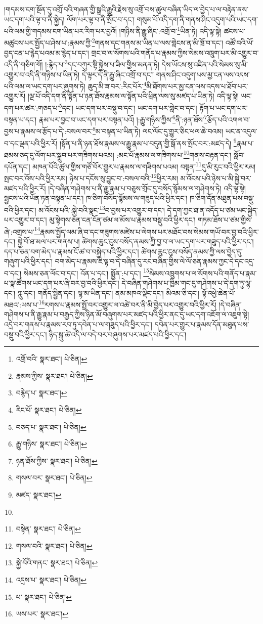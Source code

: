 །གདམས་ངག་སྔོན་དུ་འགྲོ་བའི་གཞན་གྱི་སྒྲའི་རྒྱུའི་རྗེས་སུ་འགྲོ་བས་ཚུལ་བཞིན་ཡིད་ལ་བྱེད་པ་ལ་བརྟེན་ནས་ཡང་དག་པའི་ལྟ་བ་ནི་སྐྱེད། ལོག་པར་ལྟ་བ་ནི་སྤོང་བ་དང་། གསུམ་པོ་འདི་དག་ནི་གནས་ཤིང་འདུག་པའི་ཡང་དག་པའི་ལམ་གྱི་གདམས་ངག་ཡིན་པར་རིག་པར་བྱའོ། །གཉིས་ནི་རྒྱུ་ཞིང་:འགྲོ་བ་\footnote{འགྲོ་བའི་  སྣར་ཐང་།  པེ་ཅིན། }ཡིན་ཏེ། འདི་ལྟ་སྟེ། ཚངས་པ་མཚུངས་པར་སྤྱོད་པ་ཤེས་པ་:རྣམས་ཀྱི་\footnote{རྣམས་ཀྱིས་  སྣར་ཐང་།  པེ་ཅིན། }གནས་དང་གནས་མ་ཡིན་པ་ལས་གླེངས་ན་མི་ཁྲོ་བ་དང་། འཚོ་བའི་ཡོ་བྱད་ངན་པ་རྙེད་པའམ་མ་རྙེད་པ་དང་། གྲང་བ་ལ་སོགས་པའི་གནོད་པ་རྣམས་ཀྱིས་སེམས་འཁྲུག་པར་མི་འགྱུར་བ་འདི་ནི་གཅིག་གོ། །:རྙེད་པ་\footnote{བརྙེད་པ་  སྣར་ཐང་། }དང་བཀུར་སྟི་སྐྱེས་པ་ཟིལ་གྱིས་མནན་ཏེ། དེས་ཡོངས་སུ་འཛིན་པའི་སེམས་སུ་མི་འགྱུར་བ་འདི་ནི་གཉིས་པ་ཡིན་ཏེ། དེ་ལྟར་དེ་ནི་རྒྱུ་ཞིང་འགྲོ་བ་དང་། གནས་ཤིང་འདུག་པས་མྱ་ངན་ལས་འདས་པའི་ལམ་ལ་ཡང་དག་པར་ཞུགས་ཏེ། ཆུད་མི་ཟ་བར་:རིང་པོར་\footnote{རིང་པོ་  སྣར་ཐང་།  པེ་ཅིན། }མི་ཐོགས་པར་མྱ་ངན་ལས་འདས་པ་ཐོབ་པར་འགྱུར་རོ། །ལྔ་པོ་འདི་དག་ནི་སྟོན་པ་ཉན་ཐོས་རྣམས་ལ་སྟོན་པའི་ཕྲིན་ལས་སུ་མཛད་པ་ཡིན་ཏེ། འདི་ལྟ་སྟེ། ཡང་དག་པར་ཚར་:གཅད་པ་\footnote{བཅད་པ་  སྣར་ཐང་།  པེ་ཅིན། }དང་། ཡང་དག་པར་བསྡུ་བ་དང་། ཡང་དག་པར་གླེང་བ་དང་། རྟོག་པ་ཡང་དག་པར་བསྟན་པ་དང་། རྣམ་པར་བྱང་བ་ཡང་དག་པར་བསྟན་པའོ། །:རྒྱུ་གཉིས་ཀྱིས་\footnote{རྒྱུ་གཉིས་  སྣར་ཐང་།  པེ་ཅིན། }ནི་:ཉན་ཐོས་\footnote{ཉན་ཐོས་ཀྱིས་  སྣར་ཐང་།  པེ་ཅིན། }རྩོད་པའི་འགལ་བ་བྱས་པ་རྣམས་ལ་རྩོད་པ་དེ་:བསལ་བར་\footnote{གསལ་བར་  སྣར་ཐང་།  པེ་ཅིན། }མ་བསྟན་པ་ཡིན་ཏེ། ལང་ལོང་དུ་གྱུར་ཅིང་ཕལ་ཆེ་བའམ། ཡང་ན་འདུལ་བ་དང་ལྡན་པའི་ཕྱིར་རོ། །སྟོན་པ་ནི་ཉན་ཐོས་རྣམས་ལ་རྒྱུ་རྣམ་པ་བདུན་གྱི་སྒོ་ནས་སྤོང་བར་:མཛད་དེ། \footnote{མཛད་  སྣར་ཐང་། }རྣམ་པ་ཐམས་ཅད་དུ་ལོག་པར་སྒྲུབ་པར་གཟིགས་པའམ། :མང་པོ་རྣམས་ལ་གཟིགས་པ་\footnote{}གནས་བརྟན་དང་། སློབ་དཔོན་དང་། མཁན་པོའི་ཚུལ་གྱིས་གཙོ་བོར་གྱུར་པ་རྣམས་ལ་གཟིགས་པའམ། བསྟན་\footnote{བསྟེན་  སྣར་ཐང་།  པེ་ཅིན། }དུ་མི་རུང་བའི་ཕྱིར་རམ། སྤང་བར་འོས་པའི་ཕྱིར་རམ། ཉེས་པ་དངོས་སུ་བྱུང་བ་:བསལ་བའི་\footnote{གསལ་བའི་  སྣར་ཐང་།  པེ་ཅིན། }ཕྱིར་རམ། མ་འོངས་པའི་ཉེས་པ་མི་སྐྱེ་བར་མཛད་པའི་ཕྱིར་རོ། །དེ་བཞིན་གཤེགས་པ་ནི་རྒྱུ་རྣམ་པ་བཅུས་གྲོང་དུ་བསོད་སྙོམས་ལ་གཤེགས་ཏེ། འདི་ལྟ་སྟེ། སྦྱངས་པའི་ཡོན་ཏན་བསྟན་པ་དང་། ཁ་ཅིག་བསོད་སྙོམས་ལ་གཟུད་པའི་ཕྱིར་དང་། ཁ་ཅིག་དོན་མཐུན་པས་བསྡུ་བའི་ཕྱིར་དང་། མ་འོངས་པའི་:སྐྱེ་བའི་སྣང་\footnote{སྐྱེ་བོའི་གནང་  སྣར་ཐང་།  པེ་ཅིན། }བ་བྱས་པར་འགྱུར་བ་དང་། དེ་དག་ཀྱང་ཐ་ན་འདོད་པ་ཙམ་ཡང་སྐྱེད་པར་འགྱུར་བ་དང་། མུ་སྟེགས་ཅན་ངན་ངོན་ཙམ་ལ་མོས་པ་རྣམས་བསྡུ་བའི་ཕྱིར་དང་། གཏམ་ཐོས་པ་ཙམ་གྱིས་ཞེ་:འགྲས་པ་\footnote{འདྲས་པ་  སྣར་ཐང་།  པེ་ཅིན། }རྣམས་སྤྱོད་ལམ་ཞི་བ་དང་གཟུགས་མཛེས་པ་ལེགས་པར་མཐོང་བས་སེམས་གཡོ་བར་བྱ་བའི་ཕྱིར་དང་། སྐྱེ་བོ་ཐ་མལ་པར་གནས་པ། ཚེགས་ཆུང་ངུས་བསོད་ནམས་ཀྱི་བྱ་བ་ལ་ཡང་དག་པར་གཟུད་པའི་ཕྱིར་དང་། དད་པ་ཅན་བག་མེད་པ་རྣམས་ངོ་ཚ་བ་བསྐྱེད་པའི་ཕྱིར་དང་། ཚེགས་ཆུང་ངུས་བསོད་ནམས་ཀྱི་ལས་བྱེད་དུ་གཞུག་པའི་ཕྱིར་དང་། བག་མེད་པ་རྣམས་ཇི་ལྟ་བ་དེ་བཞིན་དུ་རང་བཞིན་གྱིས་ལེ་ལོ་ཅན་རྣམས་ཀྱང་དེ་དང་འདྲ་བ་དང་། སེམས་ཅན་ལོང་བ་དང་། འོན་པ་དང་། སྨྱོན་:པ་དང་། \footnote{པ་  སྣར་ཐང་།  པེ་ཅིན། }སེམས་འཁྲུགས་པ་ལ་སོགས་པའི་གནོད་པ་རྣམ་པ་སྣ་ཚོགས་ཡང་དག་པར་ཞི་བར་བྱ་བའི་ཕྱིར་དང་། དེ་བཞིན་གཤེགས་པ་ཁྱིམ་གང་དུ་གཤེགས་པ་དེ་དག་ཏུ་ལྷ་དང་། ཀླུ་དང་། གནོད་སྦྱིན་དང་། ལྷ་མ་ཡིན་དང་། ནམ་མཁའ་ལྡིང་དང་། མིའམ་ཅི་དང་། ལྟོ་འཕྱེ་ཆེན་པོ་མཐའ་:ཡས་པ་\footnote{ཡས་པར་  སྣར་ཐང་། }རགས་པ་རྣམས་སྤྲོ་བར་འགྱུར་ལ་འཚེ་བར་ནི་མི་བྱེད་པར་འགྱུར་བའི་ཕྱིར་རོ། །དེ་བཞིན་གཤེགས་པ་ནི་རྒྱུ་རྣམ་པ་བརྒྱད་ཀྱིས་ཉིན་མོ་བཞུགས་པར་མཛད་པའི་ཕྱིར་ནང་དུ་ཡང་དག་འཇོག་ལ་འཇུག་སྟེ། འདྲེ་བར་གནས་པ་རྣམས་རབ་ཏུ་དབེན་པ་ལ་གཟུད་པའི་ཕྱིར་དང་། དབེན་པར་གྱུར་པ་རྣམས་དོན་མཐུན་པས་བསྡུ་བའི་ཕྱིར་དང་། ཉིད་སྐུ་ཚེ་འདི་ལ་བདེ་བར་བཞུགས་པར་མཛད་པའི་ཕྱིར་དང་། 